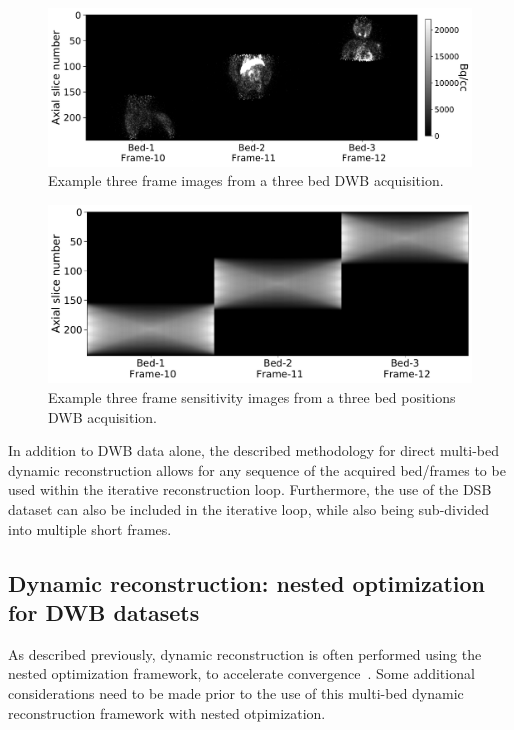 %
\begin{figure} [h!]
\includegraphics[scale=0.5,angle=0]{3_Results/3_3_DWB_Reconstruction/figures/Macaque_3D.pdf}
\caption{Example three frame images from a three bed DWB acquisition.} 
\label{fig_3_3:Macaque}
\end{figure} 
%
\begin{figure} [h!]
\includegraphics[scale=0.42,angle=0]{3_Results/3_3_DWB_Reconstruction/figures/Macaque_Sensitivity.pdf}
\caption{Example three frame sensitivity images from a three bed positions DWB acquisition.} 
\label{fig_3_3:Macaque_Sensitivity}
\end{figure} 
%
In addition to DWB data alone, the described methodology for direct multi-bed dynamic reconstruction allows for any sequence of the acquired bed/frames to be used within the iterative reconstruction loop. Furthermore, the use of the DSB dataset can also be included in the iterative loop, while also being sub-divided into multiple short frames.

\subsection{Dynamic reconstruction: nested optimization for DWB datasets}
As described previously, dynamic reconstruction is often performed using the nested optimization framework, to accelerate convergence~\cite{Wang2010,Matthews2010}.
Some additional considerations need to be made prior to the use of this multi-bed dynamic reconstruction framework with nested otpimization.

